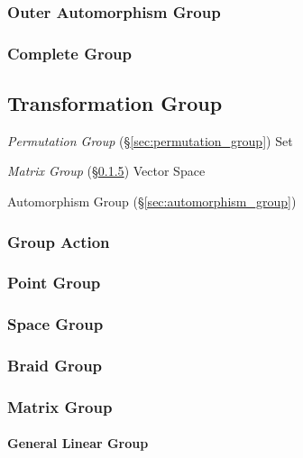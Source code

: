 \subsubsection{Outer Automorphism Group}\label{sec:outer_automorphism_group}

\subsubsection{Complete Group}\label{sec:complete_group}



\subsection{Transformation Group}\label{sec:transformation_group}

\emph{Permutation Group} (\S\ref{sec:permutation_group}) Set

\emph{Matrix Group} (\S\ref{sec:matrix_group}) Vector Space

Automorphism Group (\S\ref{sec:automorphism_group})



\subsubsection{Group Action}\label{sec:group_action}

\subsubsection{Point Group}\label{sec:point_group}

\subsubsection{Space Group}\label{sec:space_group}

\subsubsection{Braid Group}\label{sec:braid_group}

\subsubsection{Matrix Group}\label{sec:matrix_group}

\paragraph{General Linear Group}\label{sec:general_linear_group}
\hfill \\

